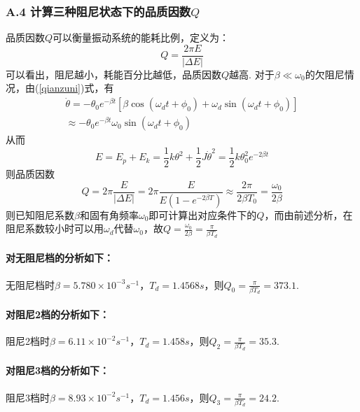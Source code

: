\documentclass[UTF8]{ctexart}
\begin{document}
\subsubsection*{A.4 计算三种阻尼状态下的品质因数$Q$}
品质因数$Q$可以衡量振动系统的能耗比例，定义为：
\begin{equation}
Q=\frac{2\pi E}{|\Delta E|}
\end{equation}
可以看出，阻尼越小，耗能百分比越低，品质因数$Q$越高. 对于$\beta \ll \omega_0$的欠阻尼情况，由(\ref{qianzuni})式，有
\begin{equation}\begin{split}
\dot{\theta}=-\theta_0 e^{-\beta t}[\beta \cos(\omega_d t+\phi_0)+\omega_d \sin(\omega_dt+\phi_0)]\\
\approx -\theta_0 e^{-\beta t}\omega_0 \sin(\omega_dt+\phi_0)
\end{split}\end{equation}
从而
\begin{equation}
E=E_p+E_k=\frac{1}{2}k\theta^2+\frac{1}{2}J\dot{\theta}^2=\frac{1}{2}k\theta_0^2e^{-2\beta t}
\end{equation}
则品质因数
\begin{equation}
Q=2\pi\frac{E}{|\Delta E|}=2\pi\frac{E}{E(1-e^{-2\beta T})}\approx \frac{2\pi}{2\beta T_0}=\frac{\omega_0}{2\beta}
\label{Q}
\end{equation}
则已知阻尼系数$\beta$和固有角频率$\omega_0$即可计算出对应条件下的$Q$，而由前述分析，在阻尼系数较小时可以用$\omega_d$代替$\omega_0$，故$\displaystyle{Q=\frac{\omega_0}{2\beta}=\frac{\pi}{\beta T_d}}$
\paragraph{对无阻尼档的分析如下：}\quad \par
无阻尼档时$\beta=5.780\times 10^{-3}s^{-1}$，$T_d=1.4568s$，则$Q_0=\frac{\pi}{\beta T_d}=373.1$.\par

\paragraph{对阻尼2档的分析如下：}\quad \par
阻尼2档时$\beta=6.11\times 10^{-2}s^{-1}$，$T_d=1.458s$，则$Q_2=\frac{\pi}{\beta T_d}=35.3$.\par

\paragraph{对阻尼3档的分析如下：}\quad \par
阻尼3档时$\beta=8.93\times 10^{-2}s^{-1}$，$T_d=1.456s$，则$Q_3=\frac{\pi}{\beta T_d}=24.2$.\par
\end{document}
